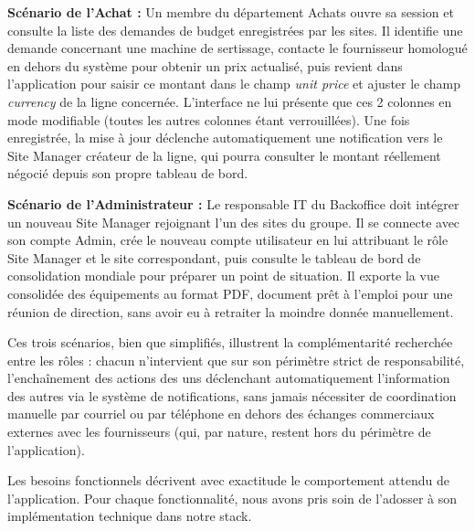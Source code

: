 \textbf{Scénario de l'Achat :} Un membre du département Achats ouvre sa session et consulte la liste des demandes de budget enregistrées par les sites. Il identifie une demande concernant une machine de sertissage, contacte le fournisseur homologué en dehors du système pour obtenir un prix actualisé, puis revient dans l'application pour saisir ce montant dans le champ \textit{unit price} et ajuster le champ \textit{currency} de la ligne concernée. L'interface ne lui présente que ces 2 colonnes en mode modifiable (toutes les autres colonnes étant verrouillées). Une fois enregistrée, la mise à jour déclenche automatiquement une notification vers le Site Manager créateur de la ligne, qui pourra consulter le montant réellement négocié depuis son propre tableau de bord.

\textbf{Scénario de l'Administrateur :} Le responsable IT du Backoffice doit intégrer un nouveau Site Manager rejoignant l'un des sites du groupe. Il se connecte avec son compte Admin, crée le nouveau compte utilisateur en lui attribuant le rôle Site Manager et le site correspondant, puis consulte le tableau de bord de consolidation mondiale pour préparer un point de situation. Il exporte la vue consolidée des équipements au format PDF, document prêt à l'emploi pour une réunion de direction, sans avoir eu à retraiter la moindre donnée manuellement.

Ces trois scénarios, bien que simplifiés, illustrent la complémentarité recherchée entre les rôles : chacun n'intervient que sur son périmètre strict de responsabilité, l'enchaînement des actions des uns déclenchant automatiquement l'information des autres via le système de notifications, sans jamais nécessiter de coordination manuelle par courriel ou par téléphone en dehors des échanges commerciaux externes avec les fournisseurs (qui, par nature, restent hors du périmètre de l'application).


Les besoins fonctionnels décrivent avec exactitude le comportement attendu de l'application. Pour chaque fonctionnalité, nous avons pris soin de l'adosser à son implémentation technique dans notre stack.

